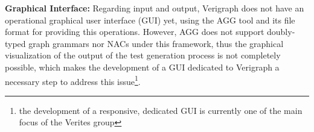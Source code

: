 \textbf{Graphical Interface:} Regarding input and output, Verigraph does not have an operational graphical user interface (GUI) yet, using the AGG tool and its  file format for providing this operations. However, AGG does not support doubly-typed graph grammars nor NACs under this framework, thus the graphical visualization of the output of the test generation process is not completely possible, which makes the development of a GUI dedicated to Verigraph a necessary step to address this issue\footnote{the development
  of a responsive, dedicated GUI is currently one of the main focus of the Verites group}.




